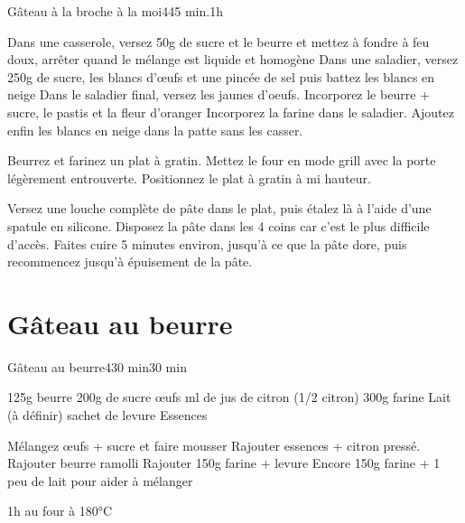 {\begin{recette}{Gâteau à la broche à la moi}{4}{45 min.}{1h}
\begin{preparation}
\etape Dans une casserole, versez 50g de sucre et le beurre et mettez à fondre à feu doux, arrêter quand le mélange est liquide et homogène
\etape Dans une saladier, versez 250g de sucre, les blancs d'œufs et une pincée de sel puis battez les blancs en neige
\etape Dans le saladier final, versez les jaunes d'oeufs. Incorporez le beurre + sucre, le pastis et la fleur d'oranger
\etape Incorporez la farine dans le saladier. 
\etape Ajoutez enfin les blancs en neige dans la patte sans les casser. 
\end{preparation}

\begin{cuisson}
Beurrez et farinez un plat à gratin. Mettez le four en mode grill avec la porte légèrement entrouverte. Positionnez le plat à gratin à mi hauteur. 

Versez une louche complète de pâte dans le plat, puis étalez là à l'aide d'une spatule en silicone. Disposez la pâte dans les 
4 coins car c'est le plus difficile d'accès. Faites cuire 5 minutes 
environ, jusqu'à ce que la pâte dore, puis recommencez jusqu'à épuisement de la pâte. 
\end{cuisson}
\end{recette}

\section{Gâteau au beurre}
\begin{recette}{Gâteau au beurre}{4}{30 min}{30 min}

\begin{ingredients}
\ingredient 125g beurre 
\ingredient 200g de sucre
 œufs
 ml de jus de citron (1/2 citron)
\ingredient 300g farine
\ingredient Lait (à définir)
 sachet de levure 
\ingredient Essences
\end{ingredients}

\begin{preparation}
\etape Mélangez œufs + sucre et faire mousser 
\etape Rajouter essences + citron pressé.
\etape Rajouter beurre ramolli
\etape Rajouter 150g farine + levure
\etape Encore 150g farine + 1 peu de lait pour aider à mélanger 
\end{preparation}

\begin{cuisson}
1h au four à 180°C
\end{cuisson}
\end{recette}

}
